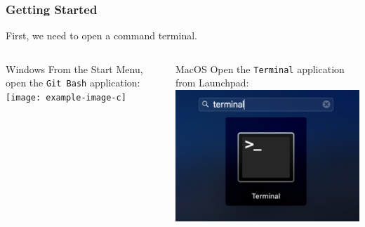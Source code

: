 \begin{frame}
    \frametitle{Getting Started}

    First, we need to open a command terminal.

    \medskip
    
    \begin{columns}
        \begin{column}{.45\textwidth}
            \begin{block}{Windows}
                From the Start Menu, open the \texttt{Git Bash} application:
                \texttt{[image: example-image-c]}
            \end{block}
        \end{column}

        \begin{column}{.45\textwidth}
            \begin{block}{MacOS}
                Open the \texttt{Terminal} application from Launchpad:
                \includegraphics[width=\textwidth]{macos_terminal.png}
            \end{block}
        \end{column}
    \end{columns}
\end{frame}